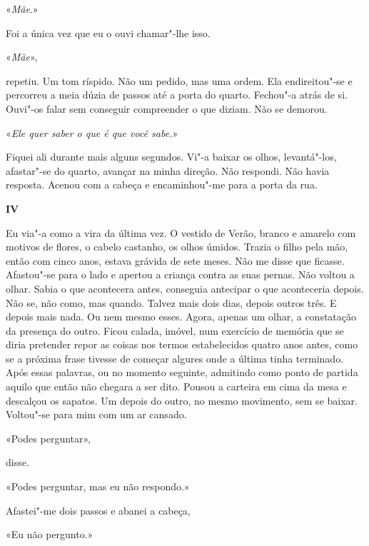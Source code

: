 «\emph{Mãe}.»

Foi a única vez que eu o ouvi chamar"-lhe isso.

«\emph{Mãe}»,

repetiu. Um tom ríspido. Não um pedido, mas uma ordem. Ela
endireitou"-se e percorreu a meia dúzia de passos até a porta do quarto.
Fechou"-a atrás de si. Ouvi"-os falar sem conseguir compreender o que
diziam. Não se demorou.

«\emph{Ele quer saber o que é que você sabe.}»

Fiquei ali durante mais alguns segundos. Vi"-a baixar os olhos,
levantá"-los, afastar"-se do quarto, avançar na minha direção. Não
respondi. Não havia resposta. Acenou com a cabeça e encaminhou"-me para
a porta da rua.

\vspace*{1.8cm}
\noindent{}\textbf{IV}

\bigskip

Eu via"-a como a vira da última vez. O vestido de Verão, branco e
amarelo com motivos de flores, o cabelo castanho, os olhos úmidos.
Trazia o filho pela mão, então com cinco anos, estava grávida de sete
meses. Não me disse que ficasse. Afastou"-se para o lado e apertou a
criança contra as suas pernas. Não voltou a olhar. Sabia o que
acontecera antes, conseguia antecipar o que aconteceria depois. Não se,
não como, mas quando. Talvez mais dois dias, depois outros três. E
depois mais nada. Ou nem mesmo esses. Agora, apenas um olhar, a
constatação da presença do outro. Ficou calada, imóvel, num exercício de
memória que se diria pretender repor as coisas nos termos estabelecidos
quatro anos antes, como se a próxima frase tivesse de começar algures
onde a última tinha terminado. Após essas palavras, ou no momento
seguinte, admitindo como ponto de partida aquilo que então não chegara a
ser dito. Pousou a carteira em cima da mesa e descalçou os sapatos. Um
depois do outro, no mesmo movimento, sem se baixar. Voltou"-se para mim
com um ar cansado.

«Podes perguntar»,

disse.

«Podes perguntar, mas eu não respondo.»

Afastei"-me dois passos e abanei a cabeça,

«Eu não pergunto.»

